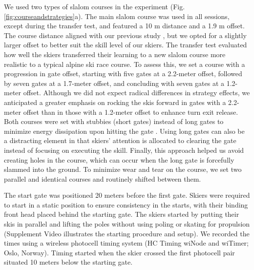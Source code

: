 \documentclass[pdflatex,sn-mathphys-num]{sn-jnl}%
\theoremstyle{thmstyleone}%
\theoremstyle{thmstyletwo}%
\theoremstyle{thmstylethree}%
\begin{document}
We used two types of slalom courses in the experiment (Fig. \ref{fig:courseandstrategies}a). The main slalom course was used in all sessions, except during the transfer test, and featured a 10 m distance and a 1.9 m offset. The course distance aligned with our previous study \cite{magelssen_is_2022}, but we opted for a slightly larger offset to better suit the skill level of our skiers. The transfer test evaluated how well the skiers transferred their learning to a new slalom course more realistic to a typical alpine ski race course. To assess this, we set a course with a progression in gate offset, starting with five gates at a 2.2-meter offset, followed by seven gates at a 1.7-meter offset, and concluding with seven gates at a 1.2-meter offset. Although we did not expect radical differences in strategy effects, we anticipated a greater emphasis on rocking the skis forward in gates with a 2.2-meter offset than in those with a 1.2-meter offset to enhance turn exit release. Both courses were set with stubbies (short gates) instead of long gates to minimize energy dissipation upon hitting the gate \cite{minetti_biomechanics_2018}. Using long gates can also be a distracting element in that skiers' attention is allocated to clearing the gate instead of focusing on executing the skill. Finally, this approach helped us avoid creating holes in the course, which can occur when the long gate is forcefully slammed into the ground. To minimize wear and tear on the course, we set two parallel and identical courses and routinely shifted between them.

The start gate was positioned 20 meters before the first gate. Skiers were required to start in a static position to ensure consistency in the starts, with their binding front head placed behind the starting gate. The skiers started by putting their skis in parallel and lifting the poles without using poling or skating for propulsion (Supplement Video illustrates the starting procedure and setup). We recorded the times using a wireless photocell timing system (HC Timing wiNode and wiTimer; Oslo, Norway). Timing started when the skier crossed the first photocell pair situated 10 meters below the starting gate. 
 
\end{document}
